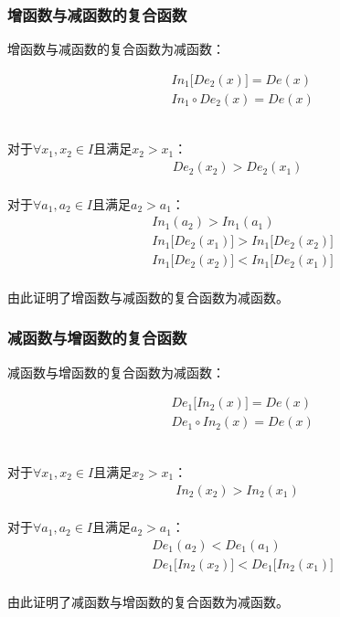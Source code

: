 \documentclass[UTF8]{ctexart}
\begin{document}
\subsubsection{增函数与减函数的复合函数}
    \setcounter{equation}{0}
    增函数与减函数的复合函数为减函数：
    \begin{large}
        \begin{align*}
            &In_1\big[De_2(x)\big]=De(x)\\[3mm]
            &In_1\circ De_2(x)=De(x)
        \end{align*}
    \end{large}\\
    对于$\forall x_1,x_2\in I$且满足$x_2>x_1$：
    \begin{align}
        De_2(x_2)>De_2(x_1)
    \end{align}\\
    对于$\forall a_1,a_2\in I$且满足$a_2>a_1$：
    \begin{align}
        &In_1(a_2)>In_1(a_1)\\[3mm]
        &In_1\big[De_2(x_1)\big]>In_1\big[De_2(x_2)\big]\\[3mm]
        &In_1\big[De_2(x_2)\big]<In_1\big[De_2(x_1)\big]
    \end{align}\\
    由此证明了增函数与减函数的复合函数为减函数。

\newpage

\subsubsection{减函数与增函数的复合函数}
    \setcounter{equation}{0}
    减函数与增函数的复合函数为减函数：
    \begin{large}
        \begin{align*}
            &De_1\big[In_2(x)\big]=De(x)\\[3mm]
            &De_1\circ In_2(x)=De(x)
        \end{align*}
    \end{large}\\
    对于$\forall x_1,x_2\in I$且满足$x_2>x_1$：
    \begin{align}
        In_2(x_2)>In_2(x_1)
    \end{align}\\
    对于$\forall a_1,a_2\in I$且满足$a_2>a_1$：
    \begin{align}
        &De_1(a_2)<De_1(a_1)\\[3mm]
        &De_1\big[In_2(x_2)\big]<De_1\big[In_2(x_1)\big]
    \end{align}\\
    由此证明了减函数与增函数的复合函数为减函数。\vspace{8pt}
\end{document}
